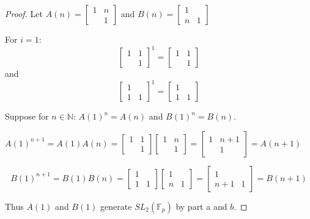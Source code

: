\documentclass{article}
\newcommand{\N}{\mathbb{N}}
\newcommand{\F}{\mathbb{F}}
\begin{document}
\begin{proof}

    Let $A(n) = \begin{bmatrix}
        1 & n \\ & 1
    \end{bmatrix}$ and $B(n) = \begin{bmatrix}
        1 \\ n & 1
    \end{bmatrix}$ 

    For $i = 1$: \[\begin{bmatrix}
        1 & 1 \\ & 1
    \end{bmatrix}^1 = \begin{bmatrix}
        1 & 1 \\ & 1
    \end{bmatrix}\] and  \[\begin{bmatrix}
        1  \\ 1& 1
    \end{bmatrix}^1 = \begin{bmatrix}
        1\\ 1 & 1
    \end{bmatrix}\]
    
    Suppose for $n \in \N$: $A(1)^n = A(n)$ and $B(1)^n = B(n)$. 
    
    $A(1)^{n + 1} = A(1)A(n) = \begin{bmatrix}
        1 & 1 \\ & 1
    \end{bmatrix} \begin{bmatrix}
        1 & n \\ & 1
    \end{bmatrix} = \begin{bmatrix}
        1 & n + 1 \\ & 1
    \end{bmatrix} = A(n + 1)$
    
    \[B(1)^{n + 1} = B(1) B(n) = \begin{bmatrix}
        1 \\ 1 & 1
    \end{bmatrix} \begin{bmatrix}
        1 \\ n & 1
    \end{bmatrix} = \begin{bmatrix}
        1 \\ n + 1 & 1
    \end{bmatrix} = B(n + 1)\]

    Thus $A(1)$ and $B(1)$ generate $SL_2(\F_p)$ by part a and $b$.      
\end{proof}
\end{document}
